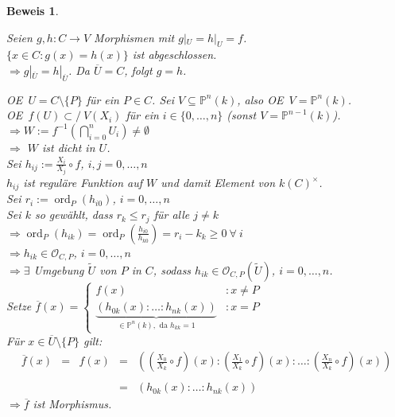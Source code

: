 \documentclass[a4paper,12pt]{report}
\theoremstyle{break}
\theoremstyle{nonumberbreak}
\newtheorem{Bew}{Beweis}
\theoremstyle{nonumberplain}
\DeclareMathOperator{\ord}{ord}
\newcommand{\IP}{\mathbb{P}}%
\newcommand{\calO}{\mathcal{O}}
\newcommand{\X}{\times}
\renewcommand{\OE}{O\!\!E~}
\newcommand{\nsubset}{\subset\!\!\!\!\!/~}
\begin{document}
\begin{Bew}\begin{description}[\setlabelstyle{\itshape}]
\item[Eindeutigkeit:] Seien $g,h:C\to V$ Morphismen mit $g|_U=h|_U=f$.\\
	$\{x\in C:g(x)=h(x)\}$ ist abgeschlossen.\\
	$\Rightarrow g|_{\overline U}=h|_{\overline U}$. Da $\overline U=C$, folgt $g=h$.
\item[Existenz:] \OE $U=C\setminus\{P\}$ f\"ur ein $P\in C$. Sei $V\subseteq\IP^n(k)$, also \OE $V=\IP^n(k)$.\\
	\OE $f(U)\nsubset V(X_i)$ f\"ur ein $i\in\{0,\ldots ,n\}$ (sonst $V=\IP^{n-1}(k)$).\\
	$\Rightarrow W:=f^{-1}(\bigcap\limits_{i=0}^n U_i) \ne \emptyset$\\
	$\Rightarrow$ $W$ ist dicht in $U$.\\
	Sei $h_{ij}:=\frac{X_i}{X_j}\circ f$, $i,j=0,\ldots ,n$\\
	$h_{ij}$ ist regul\"are Funktion auf $W$ und damit Element von $k(C)^\X$.\\
	Sei $r_i:=\ord_P(h_{i0})$, $i=0,\ldots ,n$\\
	Sei $k$ so gew\"ahlt, dass $r_k\le r_j$ f\"ur alle $j\ne k$\\
	$\Rightarrow \ord_P(h_{ik}) = \ord_P(\frac{h_{i0}}{h_{k0}}) = r_i-k_k \ge 0 \ \forall \ i$\\
	$\Rightarrow h_{ik}\in \calO_{C,P}$, $i=0,\ldots ,n$\\
	$\Rightarrow \exists$ Umgebung $\widetilde U$ von $P$ in $C$, sodass $h_{ik}\in \calO_{C,P}(\widetilde U)$, $i=0,\ldots ,n$.\\
	Setze $\overline f(x)=\left\{\begin{array}{lr}f(x) & :x\ne P\\ \underbrace{(h_{0k}(x):\ldots:h_{nk}(x))}_{\in\IP^n(k), \text{ da } h_{kk}=1} & :x=P \end{array}\right.$\\
	F\"ur $x\in \overline U\setminus\{P\}$ gilt:
	\[\begin{array}{rrrrl}
	\overline f(x) &=& f(x) &=& \left( \left( \frac{X_0}{X_k}\circ f \right) (x) : \left( \frac{X_1}{X_k}\circ f \right) (x) : \ldots : \left( \frac{X_n}{X_k}\circ f \right) (x) \right)\\
	&&&&\\
	&&&=& (h_{0k}(x):\ldots :h_{nk}(x))\end{array}\]
	$\Rightarrow \overline f$ ist Morphismus.
\end{description}\end{Bew}
\end{document}
